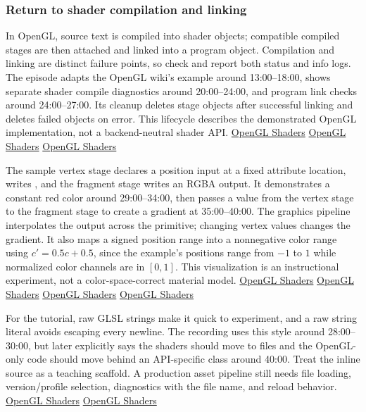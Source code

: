 \subsubsection{Return to shader compilation and linking}\label{06-engine-ii-ch025-return-to-shader-compilation-and-linking}

\hypertarget{06-engine-ii-ch025-return-to-shader-compilation-and-linking}{}

In OpenGL, source text is compiled into shader objects; compatible compiled stages are then attached and linked into a program object. Compilation and linking are distinct failure points, so check and report both status and info logs. The episode adapts the OpenGL wiki's example around 13:00--18:00, shows separate shader compile diagnostics around 20:00--24:00, and program link checks around 24:00--27:00. Its cleanup deletes stage objects after successful linking and deletes failed objects on error. This lifecycle describes the demonstrated OpenGL implementation, not a backend-neutral shader API. \href{https://www.youtube.com/watch?v=QBCCHm_9HV8&t=780s}{OpenGL Shaders} \href{https://www.youtube.com/watch?v=QBCCHm_9HV8&t=1200s}{OpenGL Shaders} \href{https://www.youtube.com/watch?v=QBCCHm_9HV8&t=1440s}{OpenGL Shaders}

The sample vertex stage declares a position input at a fixed attribute location, writes , and the fragment stage writes an RGBA output. It demonstrates a constant red color around 29:00--34:00, then passes a value from the vertex stage to the fragment stage to create a gradient at 35:00--40:00. The graphics pipeline interpolates the output across the primitive; changing vertex values changes the gradient. It also maps a signed position range into a nonnegative color range using \(c'=0.5c+0.5\), since the example's positions range from \(-1\) to \(1\) while normalized color channels are in \([0,1]\). This visualization is an instructional experiment, not a color-space-correct material model. \href{https://www.youtube.com/watch?v=QBCCHm_9HV8&t=1740s}{OpenGL Shaders} \href{https://www.youtube.com/watch?v=QBCCHm_9HV8&t=2040s}{OpenGL Shaders} \href{https://www.youtube.com/watch?v=QBCCHm_9HV8&t=2220s}{OpenGL Shaders} \href{https://www.youtube.com/watch?v=QBCCHm_9HV8&t=2340s}{OpenGL Shaders}

For the tutorial, raw GLSL strings make it quick to experiment, and a raw string literal avoids escaping every newline. The recording uses this style around 28:00--30:00, but later explicitly says the shaders should move to files and the OpenGL-only code should move behind an API-specific class around 40:00. Treat the inline source as a teaching scaffold. A production asset pipeline still needs file loading, version/profile selection, diagnostics with the file name, and reload behavior. \href{https://www.youtube.com/watch?v=QBCCHm_9HV8&t=1680s}{OpenGL Shaders} \href{https://www.youtube.com/watch?v=QBCCHm_9HV8&t=2400s}{OpenGL Shaders}

